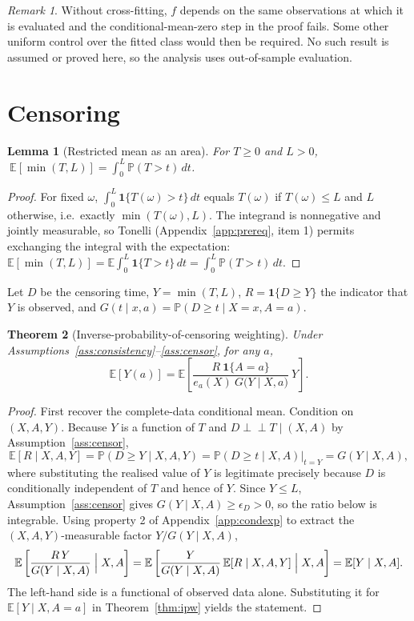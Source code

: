 \documentclass[11pt,a4paper]{article}
\theoremstyle{plain}
\newtheorem{theorem}{Theorem}[section]
\newtheorem{lemma}[theorem]{Lemma}
\theoremstyle{definition}
\theoremstyle{remark}
\newtheorem*{remark*}{Remark}
\newcommand{\E}{\mathbb E}
\newcommand{\Prob}{\mathbb P}
\newcommand{\indep}{\perp\!\!\!\perp}
\newcommand{\one}[1]{\mathbf 1\{#1\}}
\begin{document}
\begin{remark*}
Without cross-fitting, $f$ depends on the same observations at which it is evaluated and the
conditional-mean-zero step in the proof fails. Some other uniform control over the fitted class
would then be required. No such result is assumed or proved here, so the analysis uses
out-of-sample evaluation.
\end{remark*}

\section{Censoring}\label{app:censor}

\begin{lemma}[Restricted mean as an area]\label{lem:rmst-area}
For $T\ge0$ and $L>0$, $\ \E[\min(T,L)]=\int_0^L\Prob(T>t)\,dt$.
\end{lemma}

\begin{proof}
For fixed $\omega$, $\int_0^L\one{T(\omega)>t}\,dt$ equals $T(\omega)$ if $T(\omega)\le L$ and
$L$ otherwise, i.e.\ exactly $\min(T(\omega),L)$. The integrand is nonnegative and jointly
measurable, so Tonelli (Appendix~\ref{app:prereq}, item 1) permits exchanging the integral with
the expectation:
$\E[\min(T,L)]=\E\int_0^L\one{T>t}\,dt=\int_0^L\Prob(T>t)\,dt$.
\end{proof}

Let $D$ be the censoring time, $Y=\min(T,L)$, $R=\one{D\ge Y}$ the indicator that $Y$ is
observed, and $G(t\mid x,a)=\Prob(D\ge t\mid X=x,A=a)$.

\begin{theorem}[Inverse-probability-of-censoring weighting]\label{thm:ipcw}
Under Assumptions~\ref{ass:consistency}--\ref{ass:censor}, for any $a$,
\[
\E[Y(a)]=\E\left[\frac{R\ \one{A=a}}{e_a(X)\ G\bigl(Y\mid X,a\bigr)}\ Y\right].
\]
\end{theorem}

\begin{proof}
First recover the complete-data conditional mean. Condition on $(X,A,Y)$. Because $Y$ is a
function of $T$ and $D\indep T\mid(X,A)$ by Assumption~\ref{ass:censor},
\[
\E[R\mid X,A,Y]=\Prob(D\ge Y\mid X,A,Y)=\Prob(D\ge t\mid X,A)\Big|_{t=Y}=G(Y\mid X,A),
\]
where substituting the realised value of $Y$ is legitimate precisely because $D$ is
conditionally independent of $T$ and hence of $Y$. Since $Y\le L$, Assumption~\ref{ass:censor}
gives $G(Y\mid X,A)\ge\epsilon_D>0$, so the ratio below is integrable. Using property 2 of
Appendix~\ref{app:condexp} to extract the $(X,A,Y)$-measurable factor $Y/G(Y\mid X,A)$,
\[
\E\left[\frac{R\,Y}{G(Y\mid X,A)}\Bigm| X,A\right]
=\E\left[\frac{Y}{G(Y\mid X,A)}\,\E[R\mid X,A,Y]\Bigm| X,A\right]
=\E[Y\mid X,A].
\]
The left-hand side is a functional of observed data alone. Substituting it for
$\E[Y\mid X,A=a]$ in Theorem~\ref{thm:ipw} yields the statement.
\end{proof}
\end{document}
